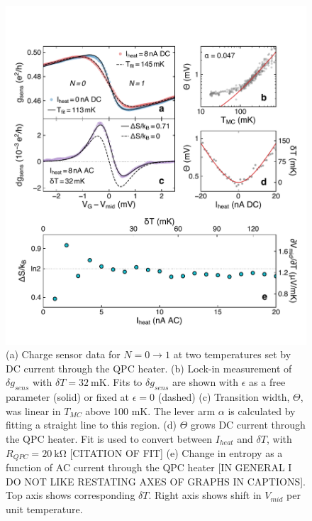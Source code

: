 \documentclass[twocolumn,showpacs,amsmath,amssymb,prl,aps,superscriptaddress]{revtex4-1}
\begin{document}
\begin{figure}[!]
        \includegraphics[width=1.0\columnwidth]{../figures/figure_2.pdf}
        \caption{\label{fig:fig2}(a) Charge sensor data for $N=0 \rightarrow 1$ at two temperatures set by DC current through the QPC heater. (b) Lock-in measurement of $\delta g_{sens}$ with $\delta T = \SI{32}{\milli\kelvin}$. Fits to $\delta g_{sens}$ are shown with $\epsilon$ as a free parameter (solid) or fixed at $\epsilon=0$ (dashed) (c) Transition width, $\Theta$, was linear in $T_{MC}$ above 100 mK. The lever arm $\alpha$ is calculated by fitting a straight line to this region. (d) $\Theta$ grows DC current through the QPC heater. Fit is used to convert between $I_{heat}$ and $\delta T$, with $R_{QPC} = \SI{20}{\kilo\ohm}$ [CITATION OF FIT] (e) Change in entropy as a function of AC current through the QPC heater [IN GENERAL I DO NOT LIKE RESTATING AXES OF GRAPHS IN CAPTIONS]. Top axis shows corresponding $\delta T$. Right axis shows shift in $V_{mid}$ per unit temperature.}
\end{figure}
\end{document}
